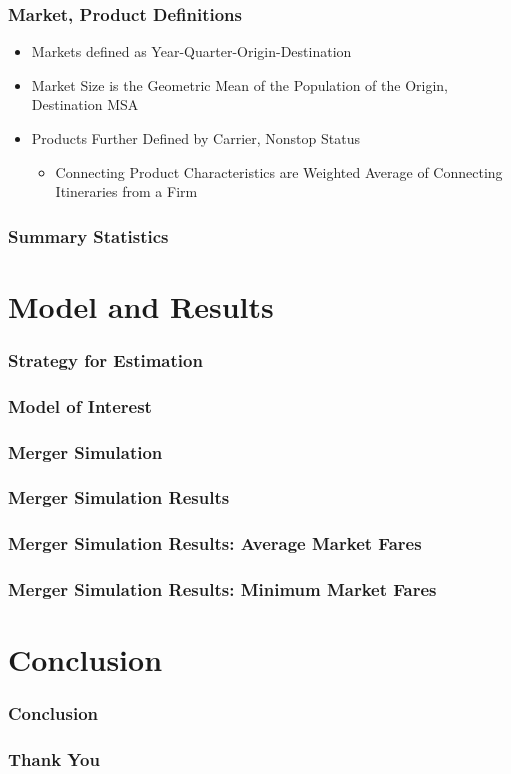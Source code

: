 \documentclass[xcolor=dvipsnames]{beamer}
\begin{document}
	\begin{frame}
		\frametitle{Market, Product Definitions}
		\begin{itemize}
			\item Markets defined as Year-Quarter-Origin-Destination 
			\item Market Size is the Geometric Mean of the Population of the Origin, Destination MSA
			\item Products Further Defined by Carrier, Nonstop Status
			\begin{itemize}
				\item Connecting Product Characteristics are Weighted Average of Connecting Itineraries from a Firm
			\end{itemize}
		\end{itemize}
	\end{frame}

	
	\begin{frame}
		\frametitle{Summary Statistics}
		
	\end{frame}
	
	\section{Model and Results}
	\begin{frame}
		\frametitle{Strategy for Estimation}
	\end{frame}
	
	\begin{frame}
		\frametitle{Model of Interest}
	\end{frame}
	
	\begin{frame}
		
	\end{frame}
	
	\begin{frame}
		\frametitle{Merger Simulation}
	\end{frame}
	
	\begin{frame}
		\frametitle{Merger Simulation Results}
		
	\end{frame}
	
		\begin{frame}
		\frametitle{Merger Simulation Results: Average Market Fares}
		
	\end{frame}
	
	\begin{frame}
		\frametitle{Merger Simulation Results: Minimum Market Fares}
		
	\end{frame}
	

	
	\section{Conclusion}
	\begin{frame}
		\frametitle{Conclusion}

	\end{frame}


	\begin{frame}
		\frametitle{Thank You}
	\end{frame}

	
	
	
\end{document}
